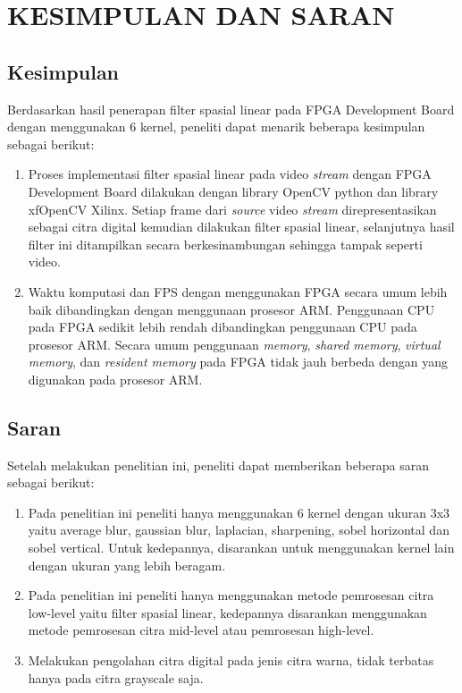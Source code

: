 
\chapter{KESIMPULAN DAN SARAN}

\section{Kesimpulan}
Berdasarkan hasil penerapan filter spasial linear pada FPGA Development Board dengan menggunakan 6 kernel, peneliti dapat menarik beberapa kesimpulan sebagai berikut:
\begin{enumerate}[topsep=0pt,itemsep=0pt,partopsep=0pt, parsep=0pt]
    \item Proses implementasi filter spasial linear pada video \textit{stream} dengan FPGA Development Board dilakukan dengan library OpenCV python dan library xfOpenCV Xilinx. Setiap frame dari \textit{source} video \textit{stream} direpresentasikan sebagai citra digital kemudian dilakukan filter spasial linear, selanjutnya hasil filter ini ditampilkan secara berkesinambungan sehingga tampak seperti video.
    \item Waktu komputasi dan FPS dengan menggunakan FPGA secara umum lebih baik dibandingkan dengan menggunaan prosesor ARM. Penggunaan CPU pada FPGA sedikit lebih rendah dibandingkan penggunaan CPU pada prosesor ARM. Secara umum penggunaan \textit{memory}, \textit{shared memory}, \textit{virtual memory}, dan \textit{resident memory} pada FPGA tidak jauh berbeda dengan yang digunakan pada prosesor ARM.
\end{enumerate}


\section{Saran}
Setelah melakukan penelitian ini, peneliti dapat memberikan beberapa saran sebagai berikut:
\begin{enumerate}[topsep=0pt,itemsep=0pt,partopsep=0pt, parsep=0pt]
    \item Pada penelitian ini peneliti hanya menggunakan 6 kernel dengan ukuran 3x3 yaitu average blur, gaussian blur, laplacian, sharpening, sobel horizontal dan sobel vertical. Untuk kedepannya, disarankan untuk menggunakan kernel lain dengan ukuran yang lebih beragam.
    \item Pada penelitian ini peneliti hanya menggunakan metode pemrosesan citra low-level yaitu filter spasial linear, kedepannya disarankan menggunakan metode pemrosesan citra mid-level atau pemrosesan high-level.
    \item Melakukan pengolahan citra digital pada jenis citra warna, tidak terbatas hanya pada citra grayscale saja.
\end{enumerate}